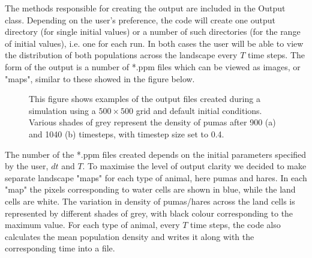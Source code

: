       The methods responsible for creating the output are included in the Output class. Depending on the user's preference, the code will create one output directory (for single initial values) or a number of such directories (for the range of initial values), i.e. one for each run. In both cases the user will be able to view the distribution of both populations across the landscape every $T$ time steps. The form of the output is a number of *.ppm files which can be viewed as images, or "maps", similar to these showed in the figure below.
     
      
      \begin{figure}[H]
      \begin{center}
      \caption{This figure shows examples of the output files created during a simulation using a $500 \times 500$ grid and default initial conditions. Various shades of grey represent the density of pumas after 900 (a) and 1040 (b) timesteps, with timestep size set to 0.4.}
      \end{center}
      \end{figure}
      
     
      The number of the *.ppm files created depends on the initial parameters specified by the user, $dt$ and $T$. To maximise the level of output clarity we decided to make separate landscape "maps" for each type of animal, here pumas and hares. In each "map" the pixels corresponding to water cells are shown in blue, while the land cells are white. The variation in density of pumas/hares across the land cells is represented by different shades of grey, with black colour corresponding to the maximum value. 
      \newline{}
      For each type of animal, every $T$ time steps, the code also calculates the mean population density and writes it along with the corresponding time into a file. 
